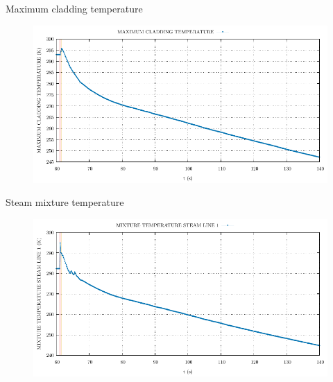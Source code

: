 \begin{frame}{Maximum cladding temperature}
	\begin{figure}
			\centering
			\includegraphics[width=\textwidth]{./02SteamLineBreak/graphs/MAXIMUM CLADDING TEMPERATURE.pdf}
			
		\end{figure}
	
\end{frame}






















\begin{frame}{Steam mixture temperature}
	\begin{figure}
		\centering
		\includegraphics[width=\textwidth]{./02SteamLineBreak/graphs/MIXTURE TEMPERATURE STEAM LINE 1.pdf}
		
	\end{figure}
	
\end{frame}



